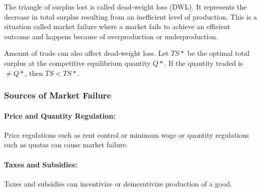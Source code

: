 \documentclass[letterpaper, 12pt]{article}
\begin{document}
The triangle of surplus lost is called dead-weight loss (DWL). It represents
the decrease in total surplus resulting from an inefficient level of production.
This is a situation called market failure where a market fails to achieve an
efficient outcome and happens because of overproduction or underproduction. \par
Amount of trade can also affect dead-weight loss. Let \( TS* \) be the optimal
total surplus at the competitive equilibrium quantity \( Q* \). If the quantity
traded is \( \neq Q* \), then \( TS < TS* \).
\begin{center}
\end{center}

\subsubsection{Sources of Market Failure}

\paragraph{Price and Quantity Regulation:}
Price regulations such as rent control or minimum wage or quantity regulations
such as quotas can cause market failure.

\paragraph{Taxes and Subsidies:}
Taxes and subsidies can incentivize or deincentivize production of a good.
\end{document}
